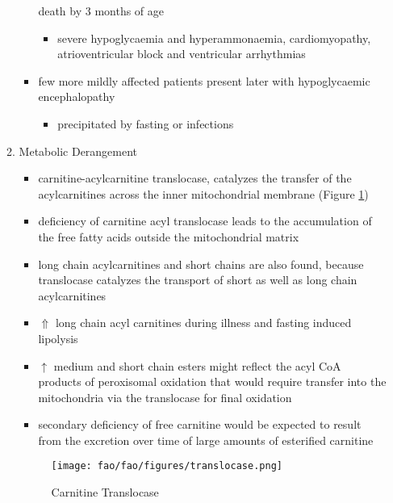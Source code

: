 \documentclass{scrartcl}
\begin{document}
\begin{enumerate}
\begin{enumerate}
\begin{itemize}
death by 3 months of age
\begin{itemize}
\item severe hypoglycaemia and hyperammonaemia, cardiomyopathy,
atrioventricular block and ventricular arrhythmias
\end{itemize}
\item few more mildly affected patients present later with hypoglycaemic
encephalopathy
\begin{itemize}
\item precipitated by fasting or infections
\end{itemize}
\end{itemize}
\item Metabolic Derangement
\label{sec:orga1953cd}
\begin{itemize}
\item carnitine-acylcarnitine translocase, catalyzes the transfer of the
acylcarnitines across the inner mitochondrial membrane (Figure \ref{fig:orgb161d69})
\item deficiency of carnitine acyl translocase leads to the accumulation
of the free fatty acids outside the mitochondrial matrix
\item long chain acylcarnitines and short chains are also found, because
translocase catalyzes the transport of short as well as long chain
acylcarnitines
\item \(\Uparrow\) long chain acyl carnitines during illness and fasting
induced lipolysis
\item \(\uparrow\) medium and short chain esters might reflect the acyl CoA products
of peroxisomal oxidation that would require transfer into the
mitochondria via the translocase for final oxidation
\item secondary deficiency of free carnitine would be expected to result
from the excretion over time of large amounts of esterified
carnitine
\end{itemize}

\begin{figure}[htbp]
\centering
\texttt{[image: fao/fao/figures/translocase.png]}
\caption{\label{fig:orgb161d69}Carnitine Translocase}
\end{figure}


\end{enumerate}
\end{enumerate}
\end{document}
